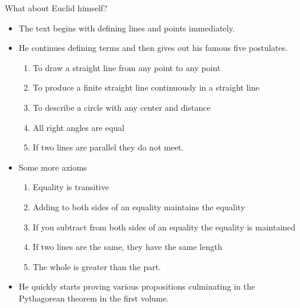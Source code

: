 \documentclass{report}
\begin{document}
\begin{description}
\begin{mdframed}
            What about Euclid himself?
            \begin{itemize}
                \item The text begins with defining
                    lines and points immediately.
                \item He continues defining terms and then gives
                    out his famous five postulates.
                    \begin{mdframed}
                        \begin{enumerate}
                            \item To draw a straight line from
                                any point to any point
                            \item To produce a finite straight line
                                continuously in a straight line
                            \item To describe a circle with any 
                                center and distance
                            \item All right angles are equal
                            \item If two lines are parallel
                                they do not meet.
                        \end{enumerate}
                    \end{mdframed}
                \item Some more axioms
                    \begin{enumerate}
                        \item Equality is transitive
                        \item Adding to both sides of
                            an equality maintains the equality
                        \item If you subtract from both sides
                            of an equality the equality is
                            maintained
                        \item If two lines are the same, they
                            have the same length
                        \item The whole is greater than the part.
                    \end{enumerate}
                \item He quickly starts proving various propositions
                    culminating in the Pythagorean theorem in the
                    first volume.

\end{itemize}
\end{mdframed}
\end{description}
\end{document}
